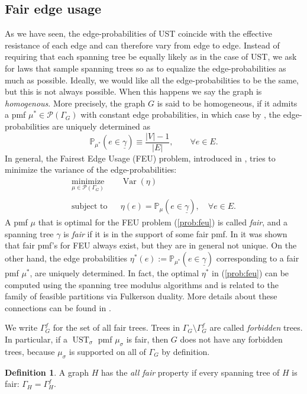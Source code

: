 \documentclass[preprint,12pt]{elsarticle}
\theoremstyle{definition}
\newtheorem{definition}[theorem]{Definition}
\theoremstyle{remark}
\numberwithin{equation}{section}
\newcommand{\cP}{\mathcal{P}}
\newcommand{\bP}{\mathbb{P}}
\newcommand{\si}{\sigma }
\newcommand{\ga}{\gamma }
\newcommand{\Ga}{\Gamma }
\newcommand{\Var}{\operatorname{Var}}
\newcommand{\UST}{\operatorname{UST}}
\begin{document}
\subsection{Fair edge usage}
As we have seen, the edge-probabilities of UST coincide with the effective resistance of each edge and can therefore vary from edge to edge. Instead of requiring that each spanning tree be equally likely as in the case of UST, we ask for laws that sample spanning trees so as to equalize the edge-probabilities as much as possible. Ideally, we would like all the edge-probabilities to be the same, but this is not always possible. When this happens we say the graph is {\it homogenous}. More precisely, the graph $G$ is said to be homogeneous, if it admits a pmf $\mu^*\in\cP(\Ga_G)$ with constant edge probabilities, in which case  by \cite[Corollary 4.5]{achpcst}, the edge-probabilities are uniquely determined as
\begin{equation}\label{eq:edge-prob}
\bP_{\mu^*}\left(e\in\underline{\ga}\right)\equiv\frac{|V|-1}{|E|},\qquad\forall e\in E.
\end{equation}
In general, the Fairest Edge Usage  (FEU) problem, introduced in \cite{achpcst}, tries to minimize the variance of the edge-probabilities:
\begin{equation}\label{prob:feu}
\begin{array}{lll}
\underset{\mu\in\cP(\Ga_G)}{\text{minimize}} && \Var (\eta) \\
&&\\
\text{subject to} &&  \eta(e)=\bP_\mu\left(e\in\underline{\ga}\right), \quad \forall e\in E.
\end{array}
\end{equation}
A pmf $\mu$ that is optimal for the FEU problem (\ref{prob:feu}) is called  {\it fair}, and a spanning tree $\gamma$ is  {\it fair} if it is in the support of some fair pmf.
In \cite{achpcst} it was shown that fair pmf's for FEU always exist, but they are in general not unique. On the other hand, the edge probabilities $\eta^*(e):=\bP_{\mu^*}\left(e\in\underline{\ga}\right)$ corresponding to a fair pmf $\mu^*$, are uniquely determined. In fact, the optimal $\eta^*$ in (\ref{prob:feu}) can be computed using the spanning tree modulus algorithms and is related to the family of feasible partitions via Fulkerson duality. More details about these connections can be found in \cite{achpcst}.


We write $\Ga_G^f$ for the set of all fair trees. Trees in $\Ga_G\setminus\Ga_G^f$ are called {\it forbidden} trees. In particular, if a $\UST_\si$ pmf $\mu_\sigma$ is fair, then $G$ does not have any forbidden trees, because $\mu_\sigma$ is supported on all of $\Gamma_G$ by definition.
\begin{definition}\label{def:allfair}
A graph $H$ has the  {\it all fair} property if every spanning tree of $H$ is fair: $\Ga_H=\Ga_H^f$.
\end{definition}
\end{document}
